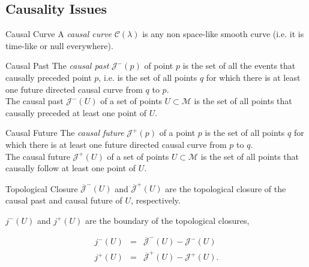 \documentclass{beamer}
\begin{document}
  	\begin{darkframes}
    
	\subsection{Causality Issues}
        \begin{frame}{Causal Curve}
			A \emph{causal curve }$\mathcal{C}\left(\lambda\right)$ is any non space-like smooth curve (i.e. it is time-like or null everywhere).
        \end{frame}
        
        \begin{frame}{Causal Past}
			The \emph{causal past} $\mathcal{J}^{-}\left(p\right)$ of point $p$
is the set of all the events that causally preceded point	$p$, i.e. is the set of all points $q$ for which there is at least	one future directed causal curve from $q$ to $p$.\\
			\bigskip
			\pause
			The causal past $\mathcal{J}^{-}\left(U\right)$ of a set of points $U\subset\mathcal{M}$ is the set of all points that causally preceded at least one point of $U$.
        \end{frame}
        
        \begin{frame}{Causal Future}
			The \emph{causal future} $\mathcal{J}^{+}\left(p\right)$ of a point $p$ is the set of all points $q$ for which there is at least one future directed causal curve from $p$ to $q$.\\ 
			\pause
			\bigskip
			The causal future $\mathcal{J}^{+}\left(U\right)$ of a set of points $U\subset\mathcal{M}$ is the set of all points that causally follow at least one point of $U$.
        \end{frame}
        
        \begin{frame}{Topological Closure}
			$\mathcal{\overline{J}}^{-}\left(U\right)$ and $\mathcal{\overline{J}}^{+}\left(U\right)$ are the topological closure of the causal past and causal future of $U$, respectively.
            \pause
            \bigskip
            
            $j^{-}\left(U\right)$ and $j^{+}\left(U\right)$ are the boundary of the topological closures, 

            \begin{eqnarray*}
            j^{-}\left(U\right) & = & \mathcal{\overline{J}}^{-}\left(U\right)-\mathcal{J}^{-}\left(U\right)\\
            j^{+}\left(U\right) & = & \mathcal{\overline{J}}^{+}\left(U\right)-\mathcal{J}^{+}\left(U\right).
            \end{eqnarray*}
        \end{frame}
        

\end{darkframes}
\end{document}
